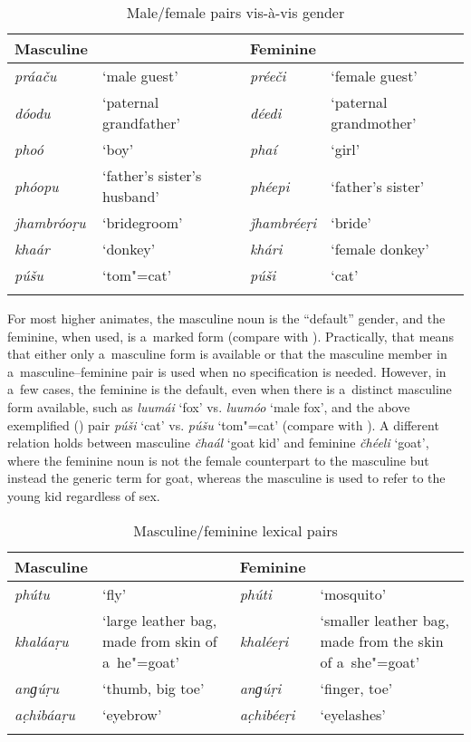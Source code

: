 \begin{table}[ht]
\caption{Male/female pairs vis-à-vis gender}
\begin{tabularx}{\textwidth}{ l Q l Q }
\lsptoprule
Masculine &
&
Feminine &
\\\hline
\textit{práaču} &
`male guest' &
\textit{préeči} &
`female guest'\\
\textit{dóodu} &
`paternal grandfather' &
\textit{déedi} &
`paternal grandmother'\\
\textit{phoó} &
`boy' &
\textit{phaí} &
`girl'\\
\textit{phóopu} &
`father's sister's husband' &
\textit{phéepi} &
`father's sister'\\
\textit{jhambróoṛu} &
`bridegroom' &
\textit{ǰhambréeṛi} &
`bride'\\
\textit{khaár} &
`donkey' &
\textit{khári} &
`female donkey'\\
\textit{púšu} &
`tom"=cat' &
\textit{púši} &
`cat'\\\lspbottomrule
\end{tabularx}
\label{tab:4-1}
\end{table}

For most higher animates, the masculine noun is the ``default'' gender, and the feminine, when used, is a~marked form (compare with ). Practically, that means that either only a~masculine form is available or that the masculine member in a~masculine--feminine pair is used when no specification is needed. However, in a~few cases, the feminine is the default, even when there is a~distinct masculine form available, such as \textit{luumái} `fox' vs. \textit{luumóo} `male fox', and the above exemplified () pair \textit{púši} `cat' vs. \textit{púšu} `tom"=cat' (compare with \citealt[103--104]{dahl2000}). A different relation holds between masculine \textit{čhaál} `goat kid' and feminine \textit{čhéeli} `goat', where the feminine noun is not the female counterpart to the masculine but instead the generic term for goat, whereas the masculine is used to refer to the young kid regardless of sex.


\begin{table}[ht]
\caption{Masculine/feminine lexical pairs}
\begin{tabularx}{\textwidth}{ l Q l Q }
\lsptoprule
Masculine &
&
Feminine &
\\\hline
\textit{phútu} &
`fly' &
\textit{phúti} &
`mosquito'\\
\textit{khaláaṛu}
&
`large leather bag, made from skin of a~he"=goat' &
\textit{khaléeṛi}
&
`smaller leather bag, made from the skin of a~she"=goat'\\
\textit{anɡúṛu} &
`thumb, big toe' &
\textit{anɡúṛi} &
`finger, toe'\\
\textit{ac̣hibáaṛu} &
`eyebrow' &
\textit{ac̣hibéeṛi} &
`eyelashes'\\\lspbottomrule
\end{tabularx}
\label{tab:4-2}
\end{table}

